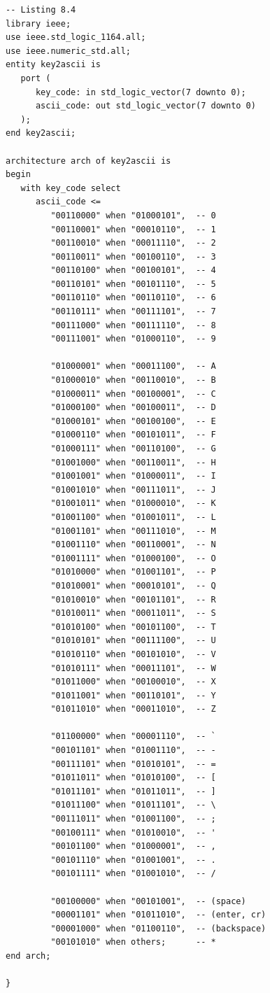 \documentclass[a4paper,12pt,twoside]{article}
\begin{document}
\begin{lstlisting}
-- Listing 8.4
library ieee;
use ieee.std_logic_1164.all;
use ieee.numeric_std.all;
entity key2ascii is
   port (
      key_code: in std_logic_vector(7 downto 0);
      ascii_code: out std_logic_vector(7 downto 0)
   );
end key2ascii;

architecture arch of key2ascii is
begin
   with key_code select
      ascii_code <=
         "00110000" when "01000101",  -- 0
         "00110001" when "00010110",  -- 1
         "00110010" when "00011110",  -- 2
         "00110011" when "00100110",  -- 3
         "00110100" when "00100101",  -- 4
         "00110101" when "00101110",  -- 5
         "00110110" when "00110110",  -- 6
         "00110111" when "00111101",  -- 7
         "00111000" when "00111110",  -- 8
         "00111001" when "01000110",  -- 9

         "01000001" when "00011100",  -- A
         "01000010" when "00110010",  -- B
         "01000011" when "00100001",  -- C
         "01000100" when "00100011",  -- D
         "01000101" when "00100100",  -- E
         "01000110" when "00101011",  -- F
         "01000111" when "00110100",  -- G
         "01001000" when "00110011",  -- H
         "01001001" when "01000011",  -- I
         "01001010" when "00111011",  -- J
         "01001011" when "01000010",  -- K
         "01001100" when "01001011",  -- L
         "01001101" when "00111010",  -- M
         "01001110" when "00110001",  -- N
         "01001111" when "01000100",  -- O
         "01010000" when "01001101",  -- P
         "01010001" when "00010101",  -- Q
         "01010010" when "00101101",  -- R
         "01010011" when "00011011",  -- S
         "01010100" when "00101100",  -- T
         "01010101" when "00111100",  -- U
         "01010110" when "00101010",  -- V
         "01010111" when "00011101",  -- W
         "01011000" when "00100010",  -- X
         "01011001" when "00110101",  -- Y
         "01011010" when "00011010",  -- Z

         "01100000" when "00001110",  -- `
         "00101101" when "01001110",  -- -
         "00111101" when "01010101",  -- =
         "01011011" when "01010100",  -- [
         "01011101" when "01011011",  -- ]
         "01011100" when "01011101",  -- \
         "00111011" when "01001100",  -- ;
         "00100111" when "01010010",  -- '
         "00101100" when "01000001",  -- ,
         "00101110" when "01001001",  -- .
         "00101111" when "01001010",  -- /

         "00100000" when "00101001",  -- (space)
         "00001101" when "01011010",  -- (enter, cr)
         "00001000" when "01100110",  -- (backspace)
         "00101010" when others;      -- *
end arch;

} \end{lstlisting}
\end{document}
